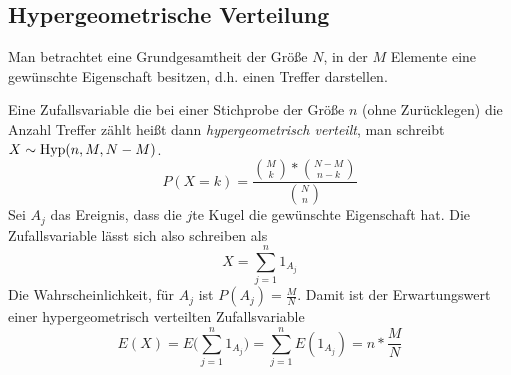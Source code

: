 \subsection{Hypergeometrische Verteilung}
Man betrachtet eine Grundgesamtheit der Größe $N$, in der $M$ Elemente eine gewünschte Eigenschaft besitzen, d.h. einen Treffer darstellen. 

Eine Zufallsvariable die bei einer Stichprobe der Größe $n$ (ohne Zurücklegen) die Anzahl Treffer zählt heißt dann \emph{hypergeometrisch verteilt}, man schreibt $X\sim \operatorname{Hyp}(n,M,N-M)$.
\begin{equation*}
 	P(X=k)=\frac{\binom Mk*\binom{N-M}{n-k}}{\binom Nn}
\end{equation*}
Sei $A_j$ das Ereignis, dass die $j$te Kugel die gewünschte Eigenschaft hat.
Die Zufallsvariable lässt sich also schreiben als
\begin{equation*}
	X=\sum_{j=1}^n 1_{A_j}
\end{equation*}
Die Wahrscheinlichkeit, für $A_j$ ist $P(A_j)=\frac MN$. Damit ist der Erwartungswert einer hypergeometrisch verteilten Zufallsvariable
\begin{equation*}
	E(X)=E\Big(\sum_{j=1}^n 1_{A_j} \Big)=\sum_{j=1}^n E(1_{A_j})=n*\frac MN
\end{equation*}
